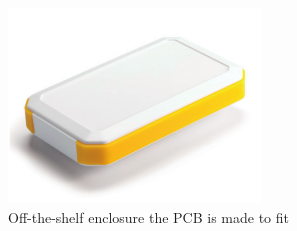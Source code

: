\documentclass[12pt,a4paper,notitlepage]{article}
\begin{document}
\begin{figure}[H]
    \centering
    \includegraphics[width=0.6\textwidth]{takachi_case.png}
    \caption{Off-the-shelf enclosure the PCB is made to fit}
    \label{fig:case}
\end{figure}


\nocite{*}
\printbibliography
\end{document}
